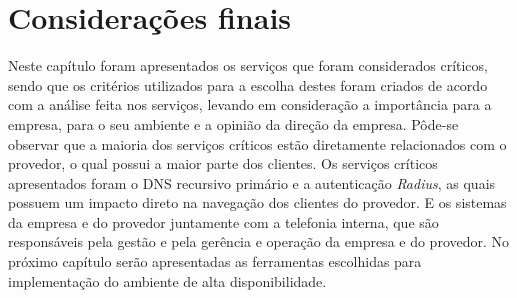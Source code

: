 \section{Considerações finais}

Neste capítulo foram apresentados os serviços que foram considerados críticos, sendo que os critérios utilizados para a escolha destes foram 
criados de acordo com a análise feita nos serviços, levando em consideração a importância para a empresa, para o seu ambiente e a opinião da 
direção da empresa. Pôde-se observar que a maioria dos serviços críticos estão diretamente relacionados com o provedor, o qual possui a maior
parte dos clientes. Os serviços críticos apresentados foram o \ac{DNS} recursivo primário e a autenticação \textit{Radius}, as quais possuem
um impacto direto na navegação dos clientes do provedor. E os sistemas da empresa e do provedor juntamente com a telefonia interna, que 
são responsáveis pela gestão e pela gerência e operação da empresa e do provedor.
No próximo capítulo serão apresentadas as ferramentas escolhidas para implementação do ambiente de alta disponibilidade. 
